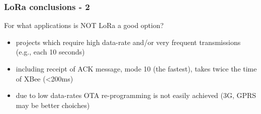  \begin{frame}[fragile]
  \frametitle{LoRa conclusions - 2}
  For what applications is NOT LoRa a good option?
  \begin{itemize}
    \item projects which require high data-rate and/or very frequent transmissions (e.g., each 10 seconds)
    \item including receipt of ACK message, mode 10 (the fastest), takes twice the time of XBee (<200ms)
    \item due to low data-rates OTA re-programming is not easily achieved (3G, GPRS may be better choiches)
  \end{itemize}
 
\end{frame}

